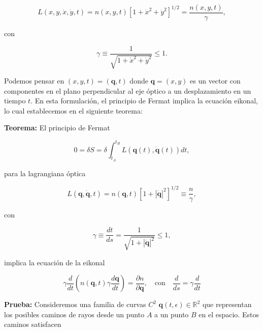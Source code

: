 \documentclass[a4paper,10pt]{article}
\numberwithin{equation}{section}
\newcommand{\teorema}{\textbf{Teorema: }}
\newcommand{\prueba}{\textbf{Prueba: }}
\begin{document}
\begin{equation}
 L(x,y,\dot{x},\dot{y},t) = n(x,y,t)\left[1 + \dot{x}^2 + \dot{y}^2 \right]^{1/2} = 
 \frac{n(x,y,t)}{\gamma},
\end{equation}

con 

\begin{equation}
 \gamma \equiv \frac{1}{\sqrt{1 + \dot{x}^2 + \dot{y}^2}} \leq 1.
\end{equation}

Podemos pensar en $(x,y,t) = (\mathbf{q},t)$ donde $\mathbf{q} = (x,y)$ es un vector 
con componentes en el plano perpendicular al eje óptico a un desplazamiento en un 
tiempo $t$. En esta formulación, el principio de Fermat implica la ecuación 
eikonal, lo cual establecemos en el siguiente teorema:

\vspace{.3cm}

\begin{mdframed}[linewidth=2]

\teorema El principio de Fermat

\begin{equation}
 0 = \delta S = \delta \int_{t_A}^{t_B} L(\mathbf{q}(t),\dot{\mathbf{q}}(t))dt, 
\end{equation}

para la lagrangiana óptica 

\begin{equation}
 L(\mathbf{q},\dot{\mathbf{q}},t) = n(\mathbf{q},t)\left[1 + |\dot{\mathbf{q}}|^2
 \right]^{1/2} \equiv \frac{n}{\gamma},
 \label{eq:113}
\end{equation}

con 

\begin{equation}
 \gamma \equiv \frac{dt}{ds} = \frac{1}{\sqrt{1 + |\dot{\mathbf{q}}|^2}} \leq 1,
 \label{eq:114}
\end{equation}

implica la ecuación de la eikonal

\begin{equation}
 \gamma\frac{d}{dt}\left(n(\mathbf{q},t)\gamma\frac{d\mathbf{q}}{dt}\right) 
 = \frac{\partial n}{\partial \mathbf{q}}, \quad \text{con} \quad 
 \frac{d}{ds} = \gamma \frac{d}{dt}
 \label{eq:115}
\end{equation}
\end{mdframed}

\prueba Consideremos una familia de curvas $C^2$ $\mathbf{q}(t,\epsilon) \in \mathbb{R}^2$ 
que representan los posibles caminos de rayos desde un punto $A$ a un punto $B$ en el 
espacio. Estos caminos satisfacen 
\end{document}
